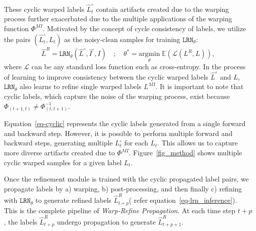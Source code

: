 These cyclic warped labels $\hat{L}_{t}^{\circ}$ contain artifacts created due to the warping process further exacerbated due to the multiple applications of the warping function $\Phi^{MI}$. 
Motivated by the concept of cycle consistency of labels, we utilize the pairs $( \hat{L}_{t}^{\circ},  L_{t})$  as the noisy-clean samples for training $\mathtt{LRN}_\theta$:
\begin{equation}
\label{eq-cyc-train}
    \hat{L}^{R} = \texttt{LRN}_\theta(\hat{L}^{\circ}, \hat{I}^{\circ}, I) \quad ; \quad   \theta^{*} = \underset{\theta}{\mathrm{argmin}}\;{ \mathbb{E}(\mathcal{L}(L^{R}, L))},
\end{equation}
where $\mathcal{L}$ can be any standard loss function such as cross-entropy. In the process of learning to improve consistency between the cyclic warped labels $\hat{L}^{\circ}$ and $L$, $\texttt{LRN}_\theta$ also learns to refine single warped labels $L^{MI}$. It is important to note that cyclic labels, which capture the noise of the warping process, exist because $\Phi_{(t+1, t)} \neq \Phi^{-1}_{(t, t+1)}$.%


Equation~\eqref{eq-cyclic} represents the cyclic labels generated from a single forward and backward step. However, it is possible to perform multiple forward and backward steps, generating multiple $L^{\circ}_{t}$ for each $L_t$. This allows us to capture more diverse artifacts created due to $\Phi^{MI}$. Figure~\ref{fig_method} shows multiple cyclic warped samples for a given label $L_t$.

Once the refinement module is trained with the cyclic propagated label pairs, we propagate labels by a) warping, b) post-processing, and then finally c) refining with $\mathtt{LRN}_\theta$ to generate refined labels $\hat{L}^R_{t+p}$( refer equation~\eqref{eq-lrn_inference}). This is the complete pipeline of \emph{Warp-Refine Propagation}. At each time step $t+p$, the labels $\hat{L}^R_{t+p}$ undergo propagation to generate $\hat{L}^R_{t+p+1}$.

